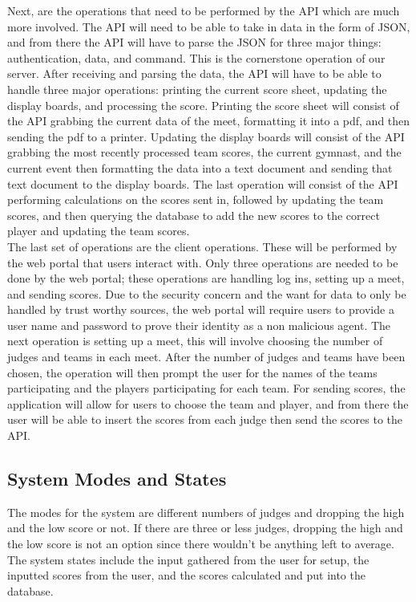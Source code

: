 \documentclass[letterpaper,10pt,draftclsnofoot,onecolumn,]{article}
\begin{document}
\noindent Next, are the operations that need to be performed by the API which are much more involved. The API will need to be able to take in data in the form of JSON, and from there the API will have to parse the JSON for three major things: authentication, data, and command. This is the cornerstone operation of our server. After receiving and parsing the data, the API will have to be able to handle three major operations: printing the current score sheet, updating the display boards, and processing the score. Printing the score sheet will consist of the API grabbing the current data of the meet, formatting it into a pdf, and then sending the pdf to a printer. Updating the display boards will consist of the API grabbing the most recently processed team scores, the current gymnast, and the current event then formatting the data into a text document and sending that text document to the display boards. The last operation will consist of the API performing calculations on the scores sent in, followed by updating the team scores, and then querying the database to add the new scores to the correct player and updating the team scores.  \\

\noindent The last set of operations are the client operations. These will be performed by the web portal that users interact with. Only three operations are needed to be done by the web portal; these operations are handling log ins, setting up a meet, and sending scores. Due to the security concern and the want for data to only be handled by trust worthy sources, the web portal will require users to provide a user name and password to prove their identity as a non malicious agent. The next operation is setting up a meet, this will involve choosing the number of judges and teams in each meet. After the number of judges and teams have been chosen, the operation will then prompt the user for the names of the teams participating and the players participating for each team. For sending scores, the application will allow for users to choose the team and player, and from there the user will be able to insert the scores from each judge then send the scores to the API.

\subsection{System Modes and States}
The modes for the system are different numbers of judges and dropping the high and the low score or not. If there are three or less judges, dropping the high and the low score is not an option since there wouldn't be anything left to average. The system states include the input gathered from the user for setup, the inputted scores from the user, and the scores calculated and put into the database.\\
\end{document}
